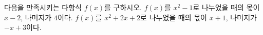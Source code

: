 다음을 만족시키는 다항식 $f(x)$를 구하시오.
 $f(x)$를 $x^2-1$로 나누었을 때의 몫이 $x-2$, 나머지가 $4$이다.
 $f(x)$를 $x^2+2x+2$로 나누었을 때의 몫이 $x+1$, 나머지가 $-x+3$이다.

